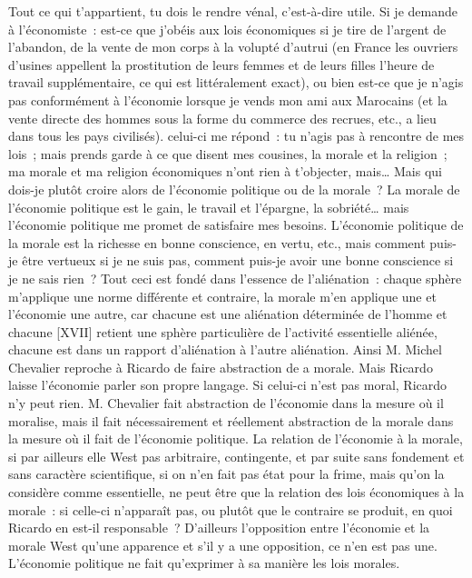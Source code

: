 \documentclass[french,twoside]{book} %
\begin{document}
Tout ce qui t’appartient, tu dois le rendre vénal, c’est-à-dire utile. Si je demande à l’économiste : est-ce que j’obéis aux lois économiques si je tire de l’argent de l’abandon, de la vente de mon corps à la volupté d’autrui (en France les ouvriers d’usines appellent la prostitution de leurs femmes et de leurs filles l’heure de travail supplémentaire, ce qui est littéralement exact), ou bien est-ce que je n’agis pas conformément à l’économie lorsque je vends mon ami aux Marocains (et la vente directe des hommes sous la forme du commerce des recrues, etc., a lieu dans tous les pays civilisés). celui-ci me répond : tu n’agis pas à rencontre de mes lois ; mais prends garde à ce que disent mes cousines, la morale et la religion ; ma morale et ma religion économiques n’ont rien à t’objecter, mais… Mais qui dois-je plutôt croire alors de l’économie politique ou de la morale ? La morale de l’économie politique est le gain, le travail et l’épargne, la sobriété… mais l’économie politique me promet de satisfaire mes besoins. L’économie politique de la morale est la richesse en bonne conscience, en vertu, etc., mais comment puis-je être vertueux si je ne suis pas, comment puis-je avoir une bonne conscience si je ne sais rien ? Tout ceci est fondé dans l’essence de l’aliénation : chaque sphère m’applique une norme différente et contraire, la morale m’en applique une et l’économie une autre, car chacune est une aliénation déterminée de l’homme et chacune [XVII] retient une sphère particulière de l’activité essentielle aliénée, chacune est dans un rapport d’aliénation à l’autre aliénation. Ainsi M. Michel Chevalier reproche à Ricardo de faire abstraction de a morale. Mais Ricardo laisse l’économie parler son propre langage. Si celui-ci n’est pas moral, Ricardo n’y peut rien. M. Chevalier fait abstraction de l’économie dans la mesure où il moralise, mais il fait nécessairement et réellement abstraction de la morale dans la mesure où il fait de l’économie politique. La relation de l’économie à la morale, si par ailleurs elle West pas arbitraire, contingente, et par suite sans fondement et sans caractère scientifique, si on n’en fait pas état pour la frime, mais qu’on la considère comme essentielle, ne peut être que la relation des lois économiques à la morale : si celle-ci n’apparaît pas, ou plutôt que le contraire se produit, en quoi Ricardo en est-il responsable ? D’ailleurs l’opposition entre l’économie et la morale West qu’une apparence et s’il y a une opposition, ce n’en est pas une. L’économie politique ne fait qu’exprimer à sa manière les lois morales.\par
\end{document}
